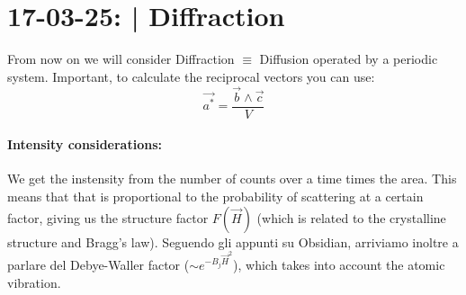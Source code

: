 \section{17-03-25: | Diffraction}

From now on we will consider Diffraction $\equiv$ Diffusion operated by a periodic system. Important, to calculate the reciprocal vectors you can use:
\begin{equation}
    \vec{a^*} = \frac{\vec{b} \wedge \vec{c}}{V}
\end{equation}

\paragraph{Intensity considerations:} We get the instensity from the number of counts over a time times the area. This means that that is proportional to the probability of scattering at a certain factor, giving us the structure factor $F(\vec{H})$ (which is related to the crystalline structure and Bragg's law).
Seguendo gli appunti su Obsidian, arriviamo inoltre a parlare del Debye-Waller factor ($\sim e^{-B_j\vec{H}^2}$), which takes into account the atomic vibration.